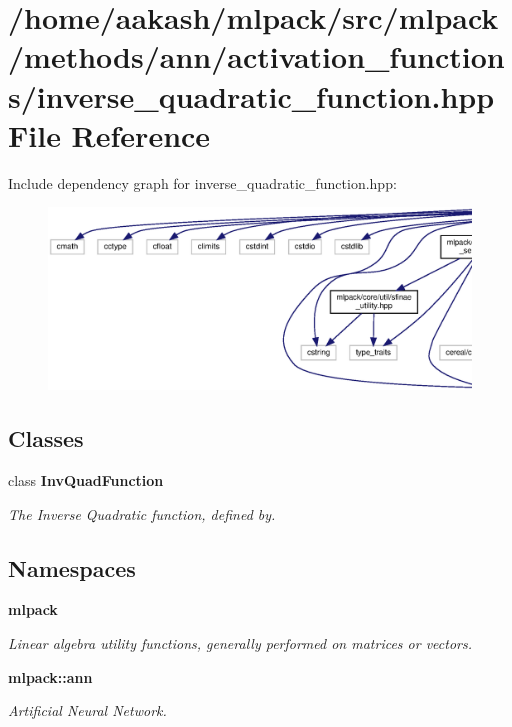 \section{/home/aakash/mlpack/src/mlpack/methods/ann/activation\+\_\+functions/inverse\+\_\+quadratic\+\_\+function.hpp File Reference}
\label{inverse__quadratic__function_8hpp}
Include dependency graph for inverse\+\_\+quadratic\+\_\+function.\+hpp\+:
\nopagebreak
\begin{figure}[H]
\begin{center}
\leavevmode
\includegraphics[width=350pt]{inverse__quadratic__function_8hpp__incl}
\end{center}
\end{figure}
\subsection*{Classes}
\begin{DoxyCompactItemize}
\item 
class \textbf{ Inv\+Quad\+Function}
\begin{DoxyCompactList}\small\item\em The Inverse Quadratic function, defined by. \end{DoxyCompactList}\end{DoxyCompactItemize}
\subsection*{Namespaces}
\begin{DoxyCompactItemize}
\item 
 \textbf{ mlpack}
\begin{DoxyCompactList}\small\item\em Linear algebra utility functions, generally performed on matrices or vectors. \end{DoxyCompactList}\item 
 \textbf{ mlpack\+::ann}
\begin{DoxyCompactList}\small\item\em Artificial Neural Network. \end{DoxyCompactList}\end{DoxyCompactItemize}


